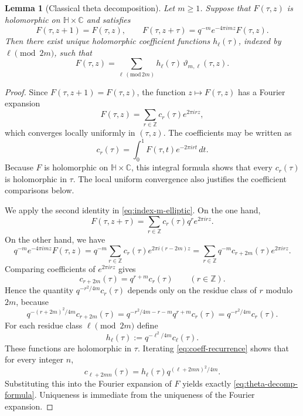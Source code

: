 \documentclass[12pt]{amsart}
\numberwithin{equation}{section}
\newtheorem{lemma}[theorem]{Lemma}
\newcommand{\CC}{\mathbb C}
\newcommand{\HH}{\mathbb H}
\newcommand{\ZZ}{\mathbb Z}
\begin{document}
\begin{lemma}[Classical theta decomposition]\label{lem:theta-decomposition}
Let \(m\geq 1\).  Suppose that \(F(\tau,z)\) is holomorphic on
\(\HH\times\CC\) and satisfies
\begin{equation}\label{eq:index-m-elliptic}
F(\tau,z+1)=F(\tau,z),
\qquad
F(\tau,z+\tau)=q^{-m}e^{-4\pi i m z}F(\tau,z).
\end{equation}
Then there exist unique holomorphic coefficient functions \(h_\ell(\tau)\), indexed by \(\ell\pmod{2m}\), such that
\begin{equation}\label{eq:theta-decomp-formula}
F(\tau,z)=\sum_{\ell\, (\mathrm{mod}\,2m)} h_\ell(\tau)\,\vartheta_{m,\ell}(\tau,z).
\end{equation}
\end{lemma}

\begin{proof}
Since \(F(\tau,z+1)=F(\tau,z)\), the function \(z\mapsto F(\tau,z)\) has a
Fourier expansion
\[
F(\tau,z)=\sum_{r\in\ZZ} c_r(\tau)e^{2\pi i r z},
\]
which converges locally uniformly in \((\tau,z)\).  The coefficients may be
written as
\[
c_r(\tau)=\int_0^1 F(\tau,t)e^{-2\pi i r t}\,dt.
\]
Because \(F\) is holomorphic on \(\HH\times\CC\), this integral formula shows
that every \(c_r(\tau)\) is holomorphic in \(\tau\).  The local uniform
convergence also justifies the coefficient comparisons below.

We apply the second identity in \eqref{eq:index-m-elliptic}.  On the one hand,
\[
F(\tau,z+\tau)=\sum_{r\in\ZZ} c_r(\tau)q^r e^{2\pi i r z}.
\]
On the other hand, we have
\[
q^{-m}e^{-4\pi i m z}F(\tau,z)
=
q^{-m}\sum_{r\in\ZZ} c_r(\tau)e^{2\pi i (r-2m)z}
=
\sum_{r\in\ZZ} q^{-m}c_{r+2m}(\tau)e^{2\pi i r z}.
\]
Comparing coefficients of \(e^{2\pi i r z}\) gives
\begin{equation}\label{eq:coeff-recurrence}
c_{r+2m}(\tau)=q^{r+m}c_r(\tau)
\qquad (r\in\ZZ).
\end{equation}
Hence the quantity \(q^{-r^2/4m}c_r(\tau)\) depends only on the residue class
of \(r\) modulo \(2m\), because
\[
q^{-(r+2m)^2/4m}c_{r+2m}(\tau)
=
q^{-r^2/4m-r-m}q^{r+m}c_r(\tau)
=
q^{-r^2/4m}c_r(\tau).
\]
For each residue class \(\ell\pmod{2m}\) define
\[
h_\ell(\tau):=q^{-\ell^2/4m}c_\ell(\tau).
\]
These functions are holomorphic in \(\tau\).  Iterating \eqref{eq:coeff-recurrence} shows that for every integer \(n\),
\[
c_{\ell+2mn}(\tau)=h_\ell(\tau)q^{(\ell+2mn)^2/4m}.
\]
Substituting this into the Fourier expansion of \(F\) yields exactly \eqref{eq:theta-decomp-formula}.  Uniqueness is immediate from the uniqueness of the Fourier expansion.
\end{proof}
\end{document}
